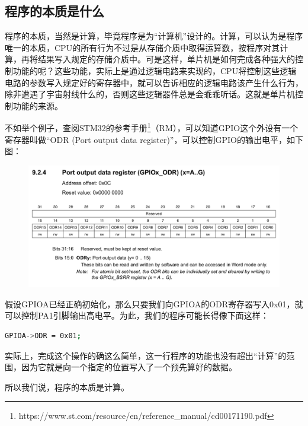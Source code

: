 \subsection{程序的本质是什么}
程序的本质，当然是计算，毕竟程序是为“计算机”设计的。计算，可以认为是程序唯一的本质，CPU的所有行为不过是从存储介质中取得运算数，按程序对其计算，再将结果写入规定的存储介质中。可是这样，单片机是如何完成各种强大的控制功能的呢？这些功能，实际上是通过逻辑电路来实现的，CPU将控制这些逻辑电路的参数写入规定好的寄存器中，就可以告诉相应的逻辑电路该产生什么行为，除非遭遇了宇宙射线什么的，否则这些逻辑器件总是会乖乖听话。这就是单片机控制功能的来源。
\par 
不如举个例子，查阅STM32的参考手册\footnote{https://www.st.com/resource/en/reference\_manual/cd00171190.pdf}（\ac{RM}），可以知道GPIO这个外设有一个寄存器叫做“ODR (Port output data register)”，可以控制GPIO的输出电平，如下图：
\par 
\begin{figure}[h]
	\includegraphics[width=\textwidth]{images/content/ODR.png}
\end{figure}
\par 
假设GPIOA已经正确初始化，那么只要我们向GPIOA的ODR寄存器写入0x01，就可以控制PA1引脚输出高电平。为此，我们的程序可能长得像下面这样：
\par 
\begin{lstlisting}[language=bash, style=customStyleC, caption=控制PA1输出高电平]
GPIOA->ODR = 0x01;
\end{lstlisting}
\par 
实际上，完成这个操作的确这么简单，这一行程序的功能也没有超出“计算”的范围，因为它就是向一个指定的位置写入了一个预先算好的数据。
\par 
所以我们说，程序的本质是计算。
